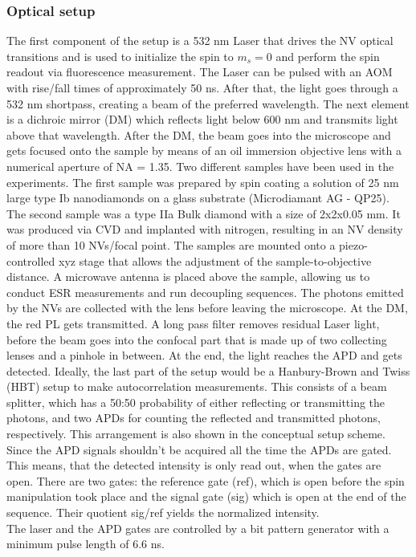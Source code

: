 \documentclass[12pt,a4paper]{article}
\begin{document}
\subsubsection{Optical setup}
The first component of the setup is a 532 nm Laser that drives the NV optical transitions and is used to initialize the spin to $m_s=0$ and perform the spin readout via fluorescence measurement. The Laser can be pulsed with an AOM with rise/fall times of approximately 50 ns. After that, the light goes through a 532 nm shortpass, creating a beam of the preferred wavelength. The next element is a dichroic mirror (DM) which reflects light below 600 nm and transmits light above that wavelength. After the DM, the beam goes into the microscope and gets focused onto the sample by means of an oil immersion objective lens with a numerical aperture of NA = 1.35. Two different samples have been used in the experiments. The first sample was prepared by spin coating a solution of 25 nm large type Ib nanodiamonds on a glass substrate (Microdiamant AG - QP25). The second sample was a type IIa Bulk diamond with a size of 2x2x0.05 mm. It was produced via CVD and implanted with nitrogen, resulting in an NV density of more than 10 NVs/focal point. The samples are mounted onto a piezo-controlled xyz stage that allows the adjustment of the sample-to-objective distance. A microwave antenna is placed above the sample, allowing us to conduct ESR measurements and run decoupling sequences. The photons emitted by the NVs are collected with the lens before leaving the microscope. At the DM, the red PL gets transmitted. A long pass filter removes residual Laser light, before the beam goes into the confocal part that is made up of two collecting lenses and a pinhole in between.
At the end, the light reaches the APD and gets detected. Ideally, the last part of the setup would be a Hanbury-Brown and Twiss (HBT) setup to make autocorrelation measurements. This consists of a beam splitter, which has a 50:50 probability of either reflecting or transmitting the photons, and two APDs for counting the reflected and transmitted photons, respectively. This arrangement is also shown in the conceptual setup scheme.\\
Since the APD signals shouldn't be acquired all the time the APDs are gated. This means, that the detected intensity is only read out, when the gates are open. There are two gates: the reference gate (ref), which is open before the spin manipulation took place and the signal gate (sig) which is open at the end of the sequence. Their quotient sig/ref yields the normalized intensity. \\
The laser and the APD gates are controlled by a bit pattern generator with a minimum pulse length of 6.6 ns.
\end{document}
